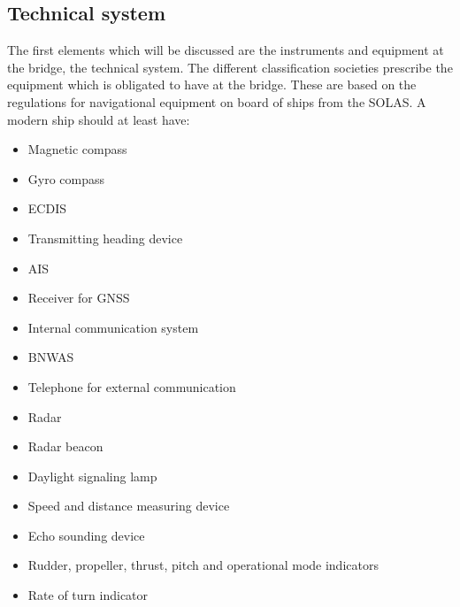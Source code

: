 \subsection{Technical system}
The first elements which will be discussed are the instruments and equipment at the bridge, the technical system. The different classification societies prescribe the equipment which is obligated to have at the bridge. These are based on the regulations for navigational equipment on board of ships from the \ac{SOLAS}. A modern ship should at least have:
\begin{multicols}{2}
	\begin{itemize}
		\item Magnetic compass
		\item Gyro compass
		\item \ac{ECDIS}
		\item Transmitting heading device
		\item \acf{AIS}
		\item Receiver for \ac{GNSS}
		\item Internal communication system
		\item \ac{BNWAS}
		\item Telephone for external communication
		\item Radar
		\item Radar beacon
		\item Daylight signaling lamp
		\item Speed and distance measuring device
		\item Echo sounding device
		\item Rudder, propeller, thrust, pitch and operational mode indicators
		\item Rate of turn indicator
	\end{itemize}
\end{multicols}

